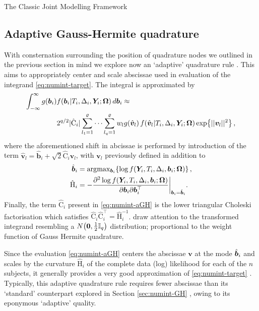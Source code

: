 \begin{chapter}{\label{cha:methods-classic}The Classic Joint Modelling Framework}
\subsection{Adaptive Gauss-Hermite quadrature}\label{sec:numint-aGH}
With consternation surrounding the position of quadrature nodes we outlined in the previous section in mind we explore now an `adaptive' quadrature rule \citep{Pinheiro1995}. This aims to appropriately center and scale abscissae used in evaluation of the integrand \eqref{eq:numint-target}. The integral is approximated by
\begin{align}
    \int_{-\infty}^\infty g\!\left(\bm{b}_i\right) &f\!\left(\bm{b}_i|T_i,\Delta_i,\bm{Y}_i;\bm{\mathrm{\Omega}}\right) d\bm{b}_i \approx \nonumber\\
    & 2^{q/2}|\hat{\mathrm{C}}_i|\sum_{l_1=1}^\varrho\dots\sum_{l_q=1}^\varrho w_l g\!\left( \hat{\bm{v}}_l\right) f\!\left( \hat{\bm{v}}_l|T_i,\Delta_i,\bm{Y}_i;\bm{\mathrm{\Omega}}\right)\exp\!\left\{||\bm{v}_l||^2\right\},
\label{eq:numint-aGH}
\end{align}
where the aforementioned shift in abcissae is performed by introduction of the term $\hat{\bm{v}}_l=\hat{\bm{b}}_i+\sqrt{2}\hat{\mathrm{C}}_i\bm{v}_l$, with $\bm{v}_l$ previously defined in addition to
\begin{align}
    \hat{\bm{b}}_i &= \arg\!\max{}\!_{\bm{b}_i}\!\left\{\log f\!\left(\bm{Y}_i, T_i, \Delta_i, \bm{b}_i;\bm{\mathrm{\Omega}}\right)\right\}, \label{eq:argmaxb}\\
    \hat{\mathrm{H}}_i&=-\frac{\partial^2\log f\!\left(\bm{Y}_i, T_i, \Delta_i, \bm{b}_i;\bm{\mathrm{\Omega}}\right)}{\partial\bm{b}_i\partial\bm{b}_i^\top}\bigg\rvert_{\bm{b}_i=\hat{\bm{b}}_i}. \label{eq:Hessb}
\end{align}
Finally, the term $\hat{\mathrm{C}}_i$ present in \eqref{eq:numint-aGH} is the lower triangular Choleski factorisation which satisfies $\hat{\mathrm{C}}_i\hat{\mathrm{C}}_i^\top=\hat{\mathrm{H}}_i^{-1}$. \citet{RizopoulosJMbook} draw attention to the transformed integrand resembling a $N\!\left(\bm{0},\frac{1}{2}\mathbb{I}_q\right)$ distribution; proportional to the weight function of Gauss Hermite quadrature.

Since the evaluation \eqref{eq:numint-aGH} centers the abscissae $\bm{v}$ at the mode $\hat{\bm{b}}_i$ and scales by the curvature $\hat{\mathrm{H}}_i$ of the complete data (log) likelihood for each of the $n$ subjects, it generally provides a very good approximation of \eqref{eq:numint-target} \citep{Stringer2022}. Typically, this adaptive quadrature rule requires fewer abscissae than its `standard' counterpart explored in Section \ref{sec:numint-GH} \citep{RizopoulosJMbook}, owing to its eponymous `adaptive' quality.


\end{chapter}
